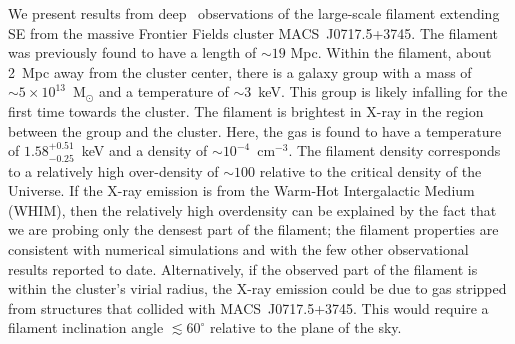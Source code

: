 We present results from deep \chandra\ observations of the large-scale filament extending SE from the massive Frontier Fields cluster MACS~J0717.5+3745. The filament was previously found to have a length of $\sim 19$ Mpc. Within the filament, about 2~Mpc away from the cluster center, there is a galaxy group with a mass of $\sim 5\times 10^{13}$~M$_\odot$ and a temperature of $\sim 3$~keV. This group is likely infalling for the first time towards the cluster. The filament is brightest in X-ray in the region between the group and the cluster. Here, the gas is found to have a temperature of $1.58_{-0.25}^{+0.51}$~keV and a density of $\sim 10^{-4}$~cm$^{-3}$. The filament density corresponds to a relatively high over-density of $\sim 100$ relative to the critical density of the Universe. If the X-ray emission is from the Warm-Hot Intergalactic Medium (WHIM), then the relatively high overdensity can be explained by the fact that we are probing only the densest part of the filament; the filament properties are consistent with numerical simulations and with the few other observational results reported to date. Alternatively, if the observed part of the filament is within the cluster's virial radius, the X-ray emission could be due to gas stripped from structures that collided with MACS~J0717.5+3745. This would require a filament inclination angle $\lesssim 60^\circ$ relative to the plane of the sky.
